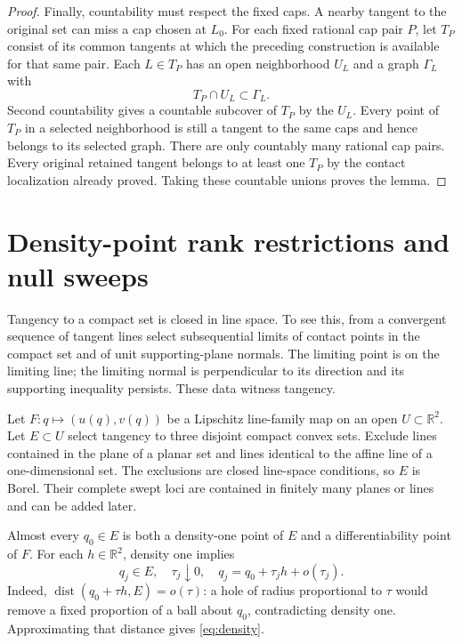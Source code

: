 \documentclass[11pt]{article}
\newcommand{\R}{\mathbb R}
\theoremstyle{remark}
\begin{document}
\begin{proof}
Finally, countability must respect the fixed caps. A nearby tangent to the original set can miss a cap chosen at $L_0$. For each fixed rational cap pair $P$, let $T_P$ consist of its common tangents at which the preceding construction is available for that same pair. Each $L\in T_P$ has an open neighborhood $U_L$ and a graph $\Gamma_L$ with
\[
T_P\cap U_L\subset\Gamma_L.
\]
Second countability gives a countable subcover of $T_P$ by the $U_L$. Every point of $T_P$ in a selected neighborhood is still a tangent to the same caps and hence belongs to its selected graph. There are only countably many rational cap pairs. Every original retained tangent belongs to at least one $T_P$ by the contact localization already proved. Taking these countable unions proves the lemma.
\end{proof}

\section{Density-point rank restrictions and null sweeps}
Tangency to a compact set is closed in line space. To see this, from a convergent sequence of tangent lines select subsequential limits of contact points in the compact set and of unit supporting-plane normals. The limiting point is on the limiting line; the limiting normal is perpendicular to its direction and its supporting inequality persists. These data witness tangency.

Let $F:q\mapsto(u(q),v(q))$ be a Lipschitz line-family map on an open $U\subset\R^2$. Let $E\subset U$ select tangency to three disjoint compact convex sets. Exclude lines contained in the plane of a planar set and lines identical to the affine line of a one-dimensional set. The exclusions are closed line-space conditions, so $E$ is Borel. Their complete swept loci are contained in finitely many planes or lines and can be added later.

Almost every $q_0\in E$ is both a density-one point of $E$ and a differentiability point of $F$. For each $h\in\R^2$, density one implies
\begin{equation}\label{eq:density}
q_j\in E,\quad \tau_j\downarrow0,\quad
q_j=q_0+\tau_jh+o(\tau_j).
\end{equation}
Indeed, $\operatorname{dist}(q_0+\tau h,E)=o(\tau)$: a hole of radius proportional to $\tau$ would remove a fixed proportion of a ball about $q_0$, contradicting density one. Approximating that distance gives \eqref{eq:density}.
\end{document}
